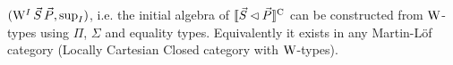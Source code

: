 \documentclass[10pt, conference, compsocconf]{IEEEtran}
\begin{document}

\begin{proposition}
  $(\mathrm{W}^I\,\vec{S}\,\vec{P},\mathrm{sup}_I)$, i.e. the initial algebra of
  $\llbracket\vec{S} \lhd \vec{P}\rrbracket^{\mathrm C}$ can be constructed from $\mathrm{W}$-types using
  $\Pi$, $\Sigma$ and equality types. Equivalently it exists in any
  Martin-L\"of category (Locally Cartesian Closed category with $\mathrm{W}$-types).
\end{proposition}
\end{document}
